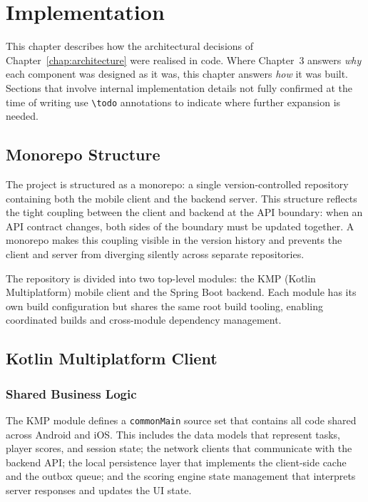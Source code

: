%
%
\chapter{Implementation}
\label{chap:implementation}

This chapter describes how the architectural decisions of Chapter~\ref{chap:architecture} were realised in code. Where Chapter~3 answers \textit{why} each component was designed as it was, this chapter answers \textit{how} it was built. Sections that involve internal implementation details not fully confirmed at the time of writing use \texttt{\textbackslash todo} annotations to indicate where further expansion is needed.

\section{Monorepo Structure}

The project is structured as a monorepo: a single version-controlled repository containing both the mobile client and the backend server. This structure reflects the tight coupling between the client and backend at the API boundary: when an API contract changes, both sides of the boundary must be updated together. A monorepo makes this coupling visible in the version history and prevents the client and server from diverging silently across separate repositories.

The repository is divided into two top-level modules: the KMP (Kotlin Multiplatform) mobile client and the Spring Boot backend. Each module has its own build configuration but shares the same root build tooling, enabling coordinated builds and cross-module dependency management.


\section{Kotlin Multiplatform Client}

\subsection{Shared Business Logic}

The KMP module defines a \texttt{commonMain} source set that contains all code shared across Android and iOS. This includes the data models that represent tasks, player scores, and session state; the network clients that communicate with the backend API; the local persistence layer that implements the client-side cache and the outbox queue; and the scoring engine state management that interprets server responses and updates the UI state.

